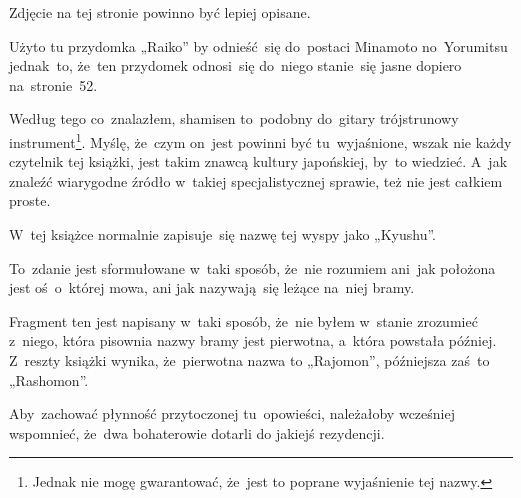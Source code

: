 \documentclass[a4paper,11pt]{article}
\begin{document}


\start {} Zdjęcie na tej stronie powinno być lepiej opisane.

\vspace{\spaceFour}



\start {} Użyto tu przydomka „Raiko” %
by odnieść~się do~postaci Minamoto no~Yorumitsu jednak~to, że~ten
przydomek odnosi~się do~niego stanie~się jasne dopiero na~stronie~52.

\vspace{\spaceFour}



\start {} Według tego co~znalazłem, shamisen
to~podobny do~gitary trójstrunowy instrument\footnote{Jednak nie mogę
  gwarantować, że~jest to poprane wyjaśnienie tej nazwy.}. Myślę,
że~czym on~jest powinni być tu~wyjaśnione, wszak nie każdy czytelnik
tej książki, jest takim znawcą kultury japońskiej, by~to wiedzieć.
A~jak znaleźć wiarygodne źródło w~takiej specjalistycznej sprawie, też
nie jest całkiem proste.

\vspace{\spaceFour}



\start {} W~tej książce normalnie zapisuje~się nazwę tej
wyspy jako „Kyushu”. %

\vspace{\spaceFour}



\start {} To~zdanie jest sformułowane w~taki sposób,
że~nie rozumiem ani~jak położona jest oś~o~której mowa, ani jak
nazywają~się leżące na~niej bramy.

\vspace{\spaceFour}



\start {} Fragment ten jest napisany w~taki sposób,
że~nie byłem w~stanie zrozumieć z~niego, która pisownia nazwy bramy
jest pierwotna, a~która powstała później. Z~reszty książki wynika,
że~pierwotna nazwa to „Rajomon”, %
późniejsza zaś~to „Rashomon”. %

\vspace{\spaceFour}



\start {} Aby~zachować płynność przytoczonej
tu~opowieści, należałoby wcześniej wspomnieć, że~dwa bohaterowie
dotarli do jakiejś rezydencji.
\end{document}
